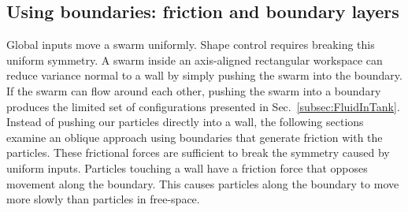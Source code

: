 \subsection{Using boundaries: friction and boundary layers}\label{subsec:WallFriction}
Global inputs move a swarm uniformly.  
Shape control requires breaking this uniform symmetry.  
A swarm inside an axis-aligned rectangular workspace can reduce variance normal to a wall by simply pushing the swarm into the boundary. 
If the swarm can flow around each other, pushing the swarm into a boundary produces the limited set of configurations presented in Sec.~\ref{subsec:FluidInTank}.
Instead of pushing our particles directly into a wall, the following sections examine an oblique approach  using boundaries that generate friction with the particles. 
 These frictional forces are  sufficient to break the symmetry caused by uniform inputs.  
 Particles touching a wall have a friction force that opposes movement along the boundary.  
This causes particles along the boundary to move more slowly than particles in free-space. 
  
